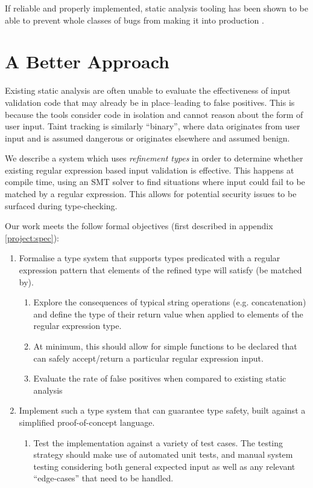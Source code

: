 \documentclass[a4paper,openany,12pt]{book}
\begin{document}
If reliable and properly implemented, static analysis tooling has been shown to be able to prevent whole classes of
bugs from making it into production \citep{sadowski2018lessons}.

\section{A Better Approach}

Existing static analysis are often unable to evaluate the effectiveness of input validation code that may already be in
place--leading to false positives.
This is because the tools consider code in isolation and cannot reason about the form of user input.
Taint tracking is similarly ``binary'', where data originates from user input and is assumed dangerous or originates
elsewhere and assumed benign.

We describe a system which uses \emph{refinement types} in order to determine whether existing regular expression based
input validation is effective.
This happens at compile time, using an SMT solver to find situations where input could fail to be matched by a regular
expression.
This allows for potential security issues to be surfaced during type-checking.

Our work meets the follow formal objectives (first described in appendix \ref{project:spec}):

\begin{enumerate}
    \item Formalise a type system that supports types predicated with a regular expression pattern that elements of the refined type will satisfy (be matched by).
    \begin{enumerate}
        \item Explore the consequences of typical string operations (e.g. concatenation) and define the type of
        their return value when applied to elements of the regular expression type.

        \item At minimum, this should allow for simple functions to be declared that can safely accept/return a
        particular regular expression input.
        \item Evaluate the rate of false positives when compared to existing static analysis
    \end{enumerate}
    \item Implement such a type system that can guarantee type safety, built against a simplified proof-of-concept
    language.
    \begin{enumerate}
        \item Test the implementation against a variety of test cases. The testing strategy should make use of
        automated unit tests, and manual system testing considering both general expected input as well as
        any relevant ``edge-cases'' that need to be handled.
    \end{enumerate}
\end{enumerate}
\end{document}
